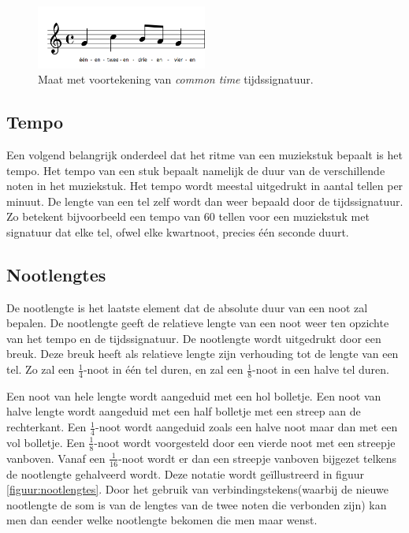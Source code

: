 \begin{figure}[!ht]
  \centering
  \includegraphics[width=0.5\textwidth]{1_Muzikale_Achtergrond/tijdssignatuur}
  \caption{Maat met voortekening van \textit{common time} tijdssignatuur.}
  \label{figuur:tijdssignatuur}
\end{figure}

\subsection{Tempo}
Een volgend belangrijk onderdeel dat het ritme van een muziekstuk bepaalt is het tempo. Het tempo van een stuk bepaalt namelijk de duur van de verschillende noten in het muziekstuk. Het tempo wordt meestal uitgedrukt in aantal tellen per minuut. De lengte van een tel zelf wordt dan weer bepaald door de tijdssignatuur. Zo betekent bijvoorbeeld een tempo van 60 tellen voor een muziekstuk met signatuur  dat elke tel, ofwel elke kwartnoot, precies \'e\'en seconde duurt. 

\subsection{Nootlengtes}
De nootlengte is het laatste element dat de absolute duur van een noot zal bepalen. De nootlengte geeft de relatieve lengte van een noot weer ten opzichte van het tempo en de tijdssignatuur. De nootlengte wordt uitgedrukt door een breuk. Deze breuk heeft als relatieve lengte zijn verhouding tot de lengte van een tel. Zo zal een $\frac{1}{4}$-noot in  \'e\'en tel duren, en zal een $\frac{1}{8}$-noot in  een halve tel duren.

Een noot van hele lengte wordt aangeduid met een hol bolletje. Een noot van halve lengte wordt aangeduid met een half bolletje met een streep aan de rechterkant. Een $\frac{1}{4}$-noot wordt aangeduid zoals een halve noot maar dan met een vol bolletje. Een $\frac{1}{8}$-noot wordt voorgesteld door een vierde noot met een streepje vanboven. Vanaf een $\frac{1}{16}$-noot wordt er dan een streepje vanboven bijgezet telkens de nootlengte gehalveerd wordt. Deze notatie wordt ge\"illustreerd in figuur \ref{figuur:nootlengtes}. Door het gebruik van verbindingstekens(waarbij de nieuwe nootlengte de som is van de lengtes van de twee noten die verbonden zijn) kan men dan eender welke nootlengte bekomen die men maar wenst. 

